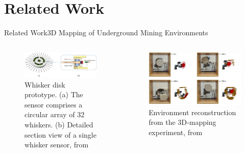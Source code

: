 \documentclass[AIRbeamer
,optEnglish
,optBiber
,optBibstyleAlphabetic
,optBeamerClassicFormat%
]{AIRlatex}
\begin{document}
    \section{Related Work}

    \begin{frame}[c]{Related Work}{3D Mapping of Underground Mining Environments}
        \begin{columns}[T,onlytextwidth]
            \begin{column}[T]{0.48\textwidth}
                \begin{figure}[H]
                    \centering
                    \includegraphics[width=\textwidth]{figures/related-works-1-prototype}
                    \caption{Whisker disk prototype. (a) The sensor comprises a circular array of 32 whiskers. (b) Detailed section view of a single whisker sensor, from~\cite{biomimetics9020083}}
                \end{figure}
            \end{column}
            \begin{column}[T]{0.48\textwidth}
                \begin{figure}[H]
                    \centering
                    \includegraphics[width=\textwidth]{figures/related-works-1-results}
                    \caption{Environment reconstruction from the 3D-mapping experiment, from ~\cite{biomimetics9020083}}
                \end{figure}
            \end{column}
        \end{columns}
    \end{frame}
\end{document}
